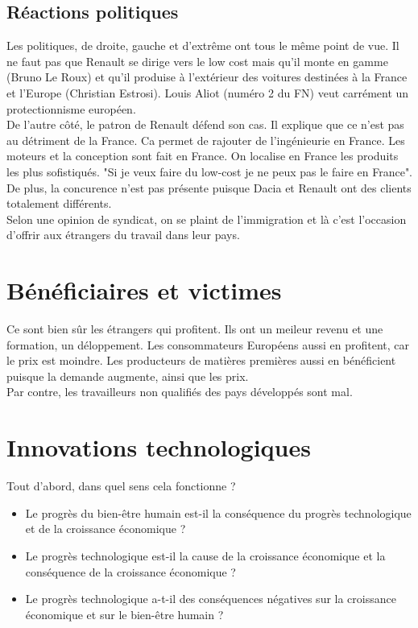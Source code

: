 \subsection{Réactions politiques}
Les politiques, de droite, gauche et d'extrême ont tous le même point de vue. Il ne faut pas que Renault se dirige vers le low cost mais qu'il monte en gamme (Bruno Le Roux) et qu'il produise à l'extérieur des voitures destinées à la France et l'Europe (Christian Estrosi). Louis Aliot (numéro 2 du FN) veut carrément un protectionnisme européen. \\
De l'autre côté, le patron de Renault défend son cas. Il explique que ce n'est pas au détriment de la France. Ca permet de rajouter de l'ingénieurie en France. Les moteurs et la conception sont fait en France. On localise en France les produits les plus sofistiqués. "Si je veux faire du low-cost je ne peux pas le faire en France". De plus, la concurence n'est pas présente puisque Dacia et Renault ont des clients totalement différents. \\
Selon une opinion de syndicat, on se plaint de l'immigration et là c'est l'occasion d'offrir aux étrangers du travail dans leur pays. 

\section{Bénéficiaires et victimes}
Ce sont bien sûr les étrangers qui profitent. Ils ont un meileur revenu et une formation, un déloppement. Les consommateurs Européens aussi en profitent, car le prix est moindre. Les producteurs de matières premières aussi en bénéficient puisque la demande augmente, ainsi que les prix. \\
Par contre, les travailleurs non qualifiés des pays développés sont mal. 

\section{Innovations technologiques}
Tout d'abord, dans quel sens cela fonctionne ? 

\begin{itemize}
	\item Le progrès du bien-être humain est-il la conséquence du progrès technologique et de la croissance économique ? 
	      	
	\item Le progrès technologique est-il la cause de la croissance économique et la conséquence de la croissance économique ? 
	      	
	\item Le progrès technologique a-t-il des conséquences négatives sur la croissance économique et sur le bien-être humain ?
\end{itemize}

